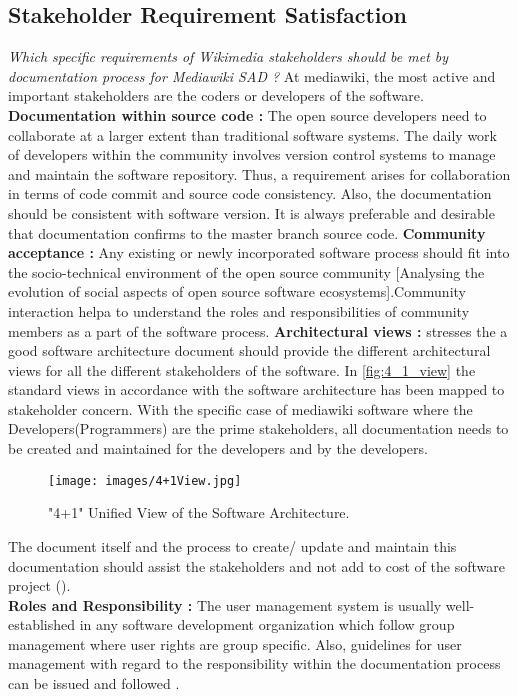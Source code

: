 \subsection{Stakeholder Requirement Satisfaction}
\indent \emph {Which specific requirements of Wikimedia stakeholders should be met by documentation process for Mediawiki SAD ?}
At mediawiki, the most active and important stakeholders are the coders or developers of the software.
\newline
\\\indent \textbf{Documentation within source code : }  The open source developers need to collaborate at a larger extent than traditional software systems. The daily work of developers within the community involves version control systems to manage and maintain the software repository. Thus, a requirement arises for collaboration in terms of code commit and source code consistency. Also, the documentation should be consistent with software version. It is always preferable  and desirable that documentation confirms to the master branch source code.
\newline
\indent \textbf{Community acceptance : }Any existing or newly incorporated software process should fit into the socio-technical environment of the open source community [Analysing the evolution of social aspects of open source software ecosystems].Community interaction helpa to understand the roles and responsibilities of community members as a part of the software process. 
\newline
\indent \textbf{Architectural views : }\cite{BachmannDocumentingSoftware2010} stresses the a good software architecture document should provide the different architectural views for all the different stakeholders of the software. In \autoref{fig:4_1_view} the standard views in accordance with the software architecture has been mapped to stakeholder concern. With the specific case of mediawiki software where the Developers(Programmers) are the prime stakeholders, all documentation needs to be created and maintained for the developers and by the developers. 
\begin{figure}[H]
  \centering
  \texttt{[image: images/4+1View.jpg]}
  \caption["4+1" Unified View of the Software Architecture \cite{bab2009}]{"4+1" Unified View of the Software Architecture.}\label{fig:4_1_view}
\end{figure}
\indent The document itself and the process to create/ update and maintain this documentation should assist the stakeholders and not add to cost of the software project (\cite{Shahin2014}).
\\\indent \textbf{Roles and Responsibility : }The user management system is usually well-established in any software development organization which follow group management where user rights are group specific. Also, guidelines for user management with regard to the responsibility within the documentation process can be issued and followed \cite{5314237}.
